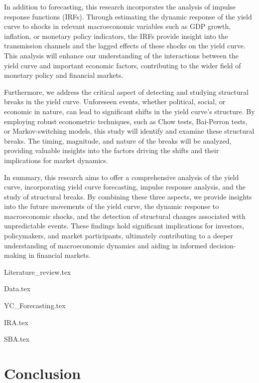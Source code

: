 \documentclass{vegaarticle}
\begin{document}
        In addition to forecasting, this research incorporates the analysis of impulse response functions (IRFs).
        Through estimating the dynamic response of the yield curve to shocks in relevant macroeconomic variables such as
        GDP growth, inflation, or monetary policy indicators, the IRFs provide insight into the transmission channels
        and the lagged effects of these shocks on the yield curve. This analysis will enhance our understanding of the
        interactions between the yield curve and important economic factors, contributing to the wider field of monetary
        policy and financial markets.
        
        Furthermore, we address the critical aspect of detecting and studying structural breaks in the yield curve.
        Unforeseen events, whether political, social, or economic in nature, can lead to significant shifts in the yield
        curve's structure. By employing robust econometric techniques, such as Chow tests, Bai-Perron tests, or
        Markov-switching models, this study will identify and examine these structural breaks. The timing, magnitude,
        and nature of the breaks will be analyzed, providing valuable insights into the factors driving the shifts and
        their implications for market dynamics.
        
        In summary, this research aims to offer a comprehensive analysis of the yield curve, incorporating yield curve
        forecasting, impulse response analysis, and the study of structural breaks. By combining these three aspects,
        we provide insights into the future movements of the yield curve, the dynamic response to macroeconomic shocks,
        and the detection of structural changes associated with unpredictable events. These findings hold significant
        implications for investors, policymakers, and market participants, ultimately contributing to a deeper
        understanding of macroeconomic dynamics and aiding in informed decision-making in financial markets.

    {Literature_review.tex}

    {Data.tex}

    {YC_Forecasting.tex}

    {IRA.tex}

    {SBA.tex}

    \section{Conclusion}

\end{document}
